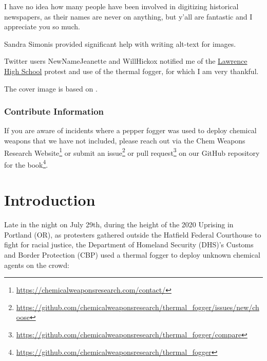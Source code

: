 \documentclass[
  11pt,
]{krantz}
\renewcommand{\href}[2]{#2\footnote{\url{#1}}}
\begin{document}
I have no idea how many people have been involved in digitizing historical newspapers, as their names are never on anything, but y'all are fantastic and I appreciate you so much.

Sandra Simonis provided significant help with writing alt-text for images.

Twitter users NewNameJeanette and WillHickox notified me of the \protect\hyperlink{Lawrence1970_04_21}{Lawrence High School} protest and use of the thermal fogger, for which I am very thankful.

The cover image is based on \citet{Lewis-Rolland2021a}.

\hypertarget{contribute-information}{%
\subsection*{Contribute Information}\label{contribute-information}}


If you are aware of incidents where a pepper fogger was used to deploy chemical weapons that we have not included, please reach out \href{https://chemicalweaponsresearch.com/contact/}{via the Chem Weapons Research Website} or submit an \href{https://github.com/chemicalweaponsresearch/thermal_fogger/issues/new/choose}{issue} or \href{https://github.com/chemicalweaponsresearch/thermal_fogger/compare}{pull request} on our \href{https://github.com/chemicalweaponsresearch/thermal_fogger}{GitHub repository for the book}.

\mainmatter

\hypertarget{introduction}{%
\chapter*{Introduction}\label{introduction}}


Late in the night on July 29th, during the height of the 2020 Uprising in Portland (OR), as protesters gathered outside the Hatfield Federal Courthouse to fight for racial justice, the Department of Homeland Security (DHS)'s Customs and Border Protection (CBP) used a thermal fogger to deploy unknown chemical agents on the crowd:
\end{document}
